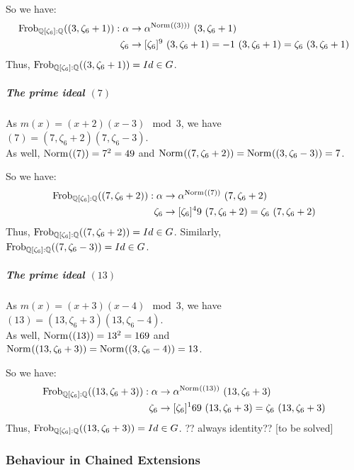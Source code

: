 So we have:
\begin{align*}
    \text{Frob}_{\mathbb{Q}[\zeta_6]:\mathbb{Q}}((3, \zeta_6+1)): \alpha & \to \alpha^{\text{Norm}_{}((3)))} \ (3, \zeta_6+1)\\
    \zeta_6   & \to [\zeta_6]^9 \ (3, \zeta_6+1) = -1 \ (3, \zeta_6+1) = \zeta_6 \ (3, \zeta_6+1)
\end{align*}
Thus, $\text{Frob}_{\mathbb{Q}[\zeta_6]:\mathbb{Q}}((3, \zeta_6+1)) = Id \in G$.

\subparagraph{The prime ideal $(7)$}
As $m(x) = (x+2)(x-3) \mod 3$, we have $(7) = (7, \zeta_6+2)(7, \zeta_6-3)$.\\
As well, $\text{Norm}_{}((7)) = 7^2 = 49$ and $\text{Norm}_{}((7, \zeta_6+2)) = \text{Norm}_{}((3, \zeta_6-3)) = 7$.

So we have:
\begin{align*}
    \text{Frob}_{\mathbb{Q}[\zeta_6]:\mathbb{Q}}((7, \zeta_6+2)): \alpha & \to \alpha^{\text{Norm}_{}((7))} \ (7, \zeta_6+2)\\
    \zeta_6   & \to [\zeta_6]^49 \ (7, \zeta_6+2) = \zeta_6 \ (7, \zeta_6+2)
\end{align*}
Thus, $\text{Frob}_{\mathbb{Q}[\zeta_6]:\mathbb{Q}}((7, \zeta_6+2)) = Id \in G$.
Similarly, $\text{Frob}_{\mathbb{Q}[\zeta_6]:\mathbb{Q}}((7, \zeta_6-3)) = Id \in G$.

\subparagraph{The prime ideal $(13)$}
As $m(x) = (x+3)(x-4) \mod 3$, we have $(13) = (13, \zeta_6+3)(13, \zeta_6-4)$.\\
As well, $\text{Norm}_{}((13)) = 13^2 = 169$ and $\text{Norm}_{}((13, \zeta_6+3)) = \text{Norm}_{}((3, \zeta_6-4)) = 13$.

So we have:
\begin{align*}
    \text{Frob}_{\mathbb{Q}[\zeta_6]:\mathbb{Q}}((13, \zeta_6+3)): \alpha & \to \alpha^{\text{Norm}_{}((13))} \ (13, \zeta_6+3)\\
    \zeta_6   & \to [\zeta_6]^169 \ (13, \zeta_6+3) = \zeta_6 \ (13, \zeta_6+3)
\end{align*}
Thus, $\text{Frob}_{\mathbb{Q}[\zeta_6]:\mathbb{Q}}((13, \zeta_6+3)) = Id \in G$.
?? always identity?? [to be solved]



\subsubsection{Behaviour in Chained Extensions}

